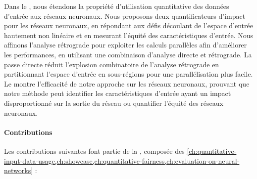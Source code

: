 {

Dans le , nous étendons la propriété d'utilisation quantitative des données d'entrée aux réseaux neuronaux. Nous proposons deux quantificateurs d'impact pour les réseaux neuronaux, en répondant aux défis découlant de l'espace d'entrée hautement non linéaire et en mesurant l'équité des caractéristiques d'entrée. Nous affinons l'analyse rétrograde pour exploiter les calculs parallèles afin d'améliorer les performances, en utilisant une combinaison d'analyse directe et rétrograde. La passe directe réduit l'explosion combinatoire de l'analyse rétrograde en partitionnant l'espace d'entrée en sous-régions pour une parallélisation plus facile. Le  montre l'efficacité de notre approche sur les réseaux neuronaux, prouvant que notre méthode peut identifier les caractéristiques d'entrée ayant un impact disproportionné sur la sortie du réseau ou quantifier l'équité des réseaux neuronaux.

\paragraph{Contributions}
Les contributions suivantes font partie de la , composée des \cref{ch:quantitative-input-data-usage,ch:showcase,ch:quantitative-fairness,ch:evaluation-on-neural-networks} :

}

